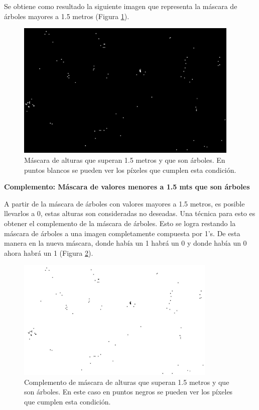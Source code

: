 \documentclass[10pt,a4paper, twoside]{report}
\begin{document}
Se obtiene como resultado la siguiente imagen que representa la máscara de árboles mayores a 1.5 metros (Figura \ref{maskTressHeight}).

\begin{figure}[H]
   \centering      
   \includegraphics[width=0.95\textwidth]{imagenes/maskTressHeight.jpg}
 \caption{Máscara de alturas que superan 1.5 metros y que son árboles. En puntos blancos se pueden ver los píxeles que cumplen esta condición.}
 \label{maskTressHeight}
\end{figure}

\textbf{Complemento: Máscara de valores menores a 1.5 mts que son árboles}

A partir de la máscara de árboles con valores mayores a 1.5 metros, es posible llevarlos a 0, estas alturas son consideradas no deseadas. Una técnica para esto es obtener el complemento de la máscara de árboles. Esto se logra restando la máscara de árboles a una imagen completamente compuesta por 1's. De esta manera en la nueva máscara, donde había un 1 habrá un 0 y donde había un 0 ahora habrá un 1 (Figura \ref{maskTressHeightCompl}).


\begin{figure}[H]
   \centering      
   \includegraphics[width=0.85\textwidth]{imagenes/maskTressHeightCompl.jpg}
 \caption{Complemento de máscara de alturas que superan 1.5 metros y que son árboles. En este caso en puntos negros se pueden ver los píxeles que cumplen esta condición.}
 \label{maskTressHeightCompl}
\end{figure}
\end{document}
